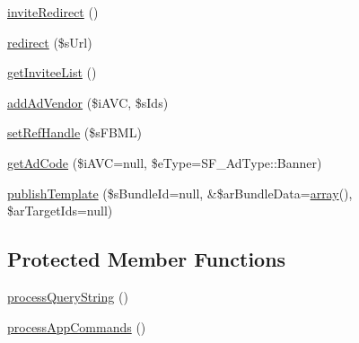 \begin{DoxyCompactItemize}
\item 
\hyperlink{classSF__App_a6deb2041e7ee4cbb3511c0f5a7ea8a03}{inviteRedirect} ()
\item 
\hyperlink{classSF__App_a83d6db3f4e5f36ddd8adad2f53133e76}{redirect} (\$sUrl)
\item 
\hyperlink{classSF__App_acf7865241ab5ac45a0f04674efe51d1a}{getInviteeList} ()
\item 
\hyperlink{classSF__App_af12c69561c23be5e6fc7e4e0a2808fbb}{addAdVendor} (\$iAVC, \$sIds)
\item 
\hyperlink{classSF__App_a3978cc0d9152ece4cd315601a95a38bd}{setRefHandle} (\$sFBML)
\item 
\hyperlink{classSF__App_a99e97980251298d31efe3451470e8df5}{getAdCode} (\$iAVC=null, \$eType=SF\_\-AdType::Banner)
\item 
\hyperlink{classSF__App_ac409888924f803214fbd2df44327242b}{publishTemplate} (\$sBundleId=null, \&\$arBundleData=\hyperlink{list_8php_aa3205d038c7f8feb5c9f01ac4dfadc88}{array}(), \$arTargetIds=null)
\end{DoxyCompactItemize}
\subsection*{Protected Member Functions}
\begin{DoxyCompactItemize}
\item 
\hyperlink{classSF__App_aa40909289ffd00ccc071d938f586fc47}{processQueryString} ()
\item 
\hyperlink{classSF__App_ac5e7c32ce7cbcf1f9f6e8684e8cefa5f}{processAppCommands} ()
\end{DoxyCompactItemize}
